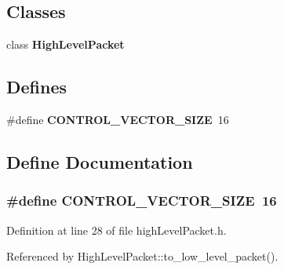 \subsection*{Classes}
\begin{CompactItemize}
\item 
class {\bf HighLevelPacket}
\end{CompactItemize}
\subsection*{Defines}
\begin{CompactItemize}
\item 
\#define {\bf CONTROL\_\-VECTOR\_\-SIZE}~16
\end{CompactItemize}


\subsection{Define Documentation}
\subsubsection[{CONTROL\_\-VECTOR\_\-SIZE}]{\setlength{\rightskip}{0pt plus 5cm}\#define CONTROL\_\-VECTOR\_\-SIZE~16}\label{highLevelPacket_8h_33774cedf72b898dc98d1505677d33a0}




Definition at line 28 of file highLevelPacket.h.

Referenced by HighLevelPacket::to\_\-low\_\-level\_\-packet().